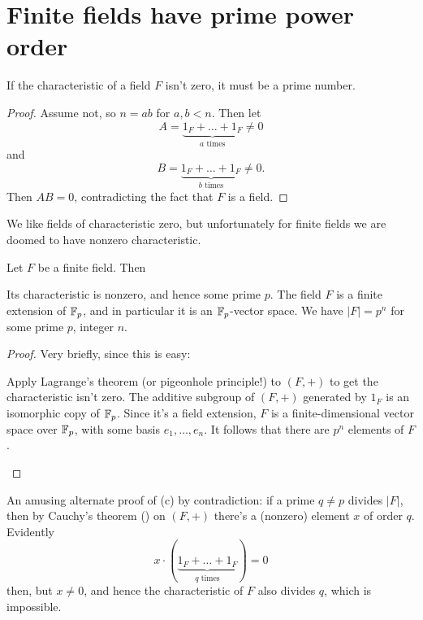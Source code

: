 \section{Finite fields have prime power order}
\begin{lemma}
	If the characteristic of a field $F$ isn't zero,
	it must be a prime number.
\end{lemma}
\begin{proof}
	Assume not, so $n = ab$ for $a,b < n$.
	Then let
	\[ A = \underbrace{1_F + \dots + 1_F}_{\text{$a$ times}} \neq 0 \]
	and
	\[ B = \underbrace{1_F + \dots + 1_F}_{\text{$b$ times}} \neq 0. \]
	Then $AB = 0$, contradicting the fact that $F$ is a field.
\end{proof}

We like fields of characteristic zero, but unfortunately for finite fields
we are doomed to have nonzero characteristic.

\begin{lemma}
	Let $F$ be a finite field.
	Then
	\begin{enumerate}[(a)]
		\ii Its characteristic is nonzero, and hence some prime $p$.
		\ii The field $F$ is a finite extension of $\mathbb F_p$,
		and in particular it is an $\mathbb F_p$-vector space.
		\ii We have $\left\lvert F \right\rvert = p^n$ for some prime $p$, integer $n$.
	\end{enumerate}
\end{lemma}
\begin{proof}
	Very briefly, since this is easy:
	\begin{enumerate}[(a)]
		\ii Apply Lagrange's theorem (or pigeonhole principle!)
		to $(F, +)$ to get the characteristic isn't zero.
		\ii The additive subgroup of $(F,+)$ generated
		by $1_F$ is an isomorphic copy of $\mathbb F_p$.
		\ii Since it's a field extension,
		$F$ is a finite-dimensional vector space over $\mathbb F_p$,
		with some basis $e_1, \dots, e_n$.
		It follows that there are $p^n$ elements of $F$. \qedhere
	\end{enumerate}
\end{proof}
\begin{remark}
	An amusing alternate proof of (c) by contradiction:
	if a prime $q \neq p$ divides $\left\lvert F \right\rvert$, then
	by Cauchy's theorem () on $(F, +)$
	there's a (nonzero) element $x$ of order $q$.
	Evidently \[ x \cdot ( \underbrace{1_F + \dots + 1_F}_{\text{$q$ times}} ) = 0 \] 
	then, but $x \neq 0$, and hence the characteristic of $F$ also divides $q$,
	which is impossible.
\end{remark}

